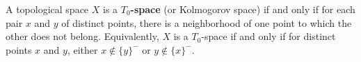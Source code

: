 A topological space $X$ is a \textbf{$T_0$-space} (or Kolmogorov space) if and only if for each pair $x$ and $y$ of distinct points, there is a neighborhood of one point to which the other does not belong. Equivalently, $X$ is a $T_0$-space if and only if for distinct points $x$ and $y$, either $x \notin \{y\}^-$ or $y \notin \{x\}^-$.

